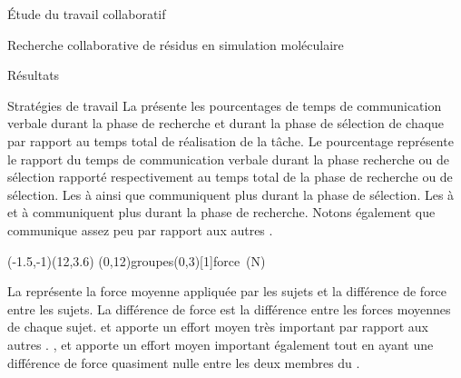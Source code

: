 \documentclass[myfrancais]{mythesis}
\begin{document}
\begin{mypart}{Étude du travail collaboratif}
\begin{mychapter}{Recherche collaborative de résidus en simulation moléculaire}
\begin{mysection}{Résultats}
\begin{mysubsection}{Stratégies de travail}
					La  présente les pourcentages de temps de communication verbale durant la phase de recherche et durant la phase de sélection de chaque  par rapport au temps total de réalisation de la tâche.
					Le pourcentage représente le rapport du temps de communication verbale durant la phase recherche ou de sélection rapporté respectivement au temps total de la phase de recherche ou de sélection.
					Les   à  ainsi que  communiquent plus durant la phase de sélection.
					Les   à  et  à  communiquent plus durant la phase de recherche.
					Notons également que  communique assez peu par rapport aux autres .

					\begin{myfigure}
						\begin{myps}(-1.5,-1)(12,3.6)
							\myaxes(0,12){groupes}(0,3)[1]{force~(N)}
						\end{myps}
					\end{myfigure}

					La  représente la force moyenne appliquée par les sujets  et la différence de force entre les sujets.
					La différence de force est la différence entre les forces moyennes de chaque sujet.
					 et  apporte un effort moyen très important par rapport aux autres .
					,  et  apporte un effort moyen important également tout en ayant une différence de force quasiment nulle entre les deux membres du .


\end{mysubsection}
\end{mysection}
\end{mychapter}
\end{mypart}
\end{document}
